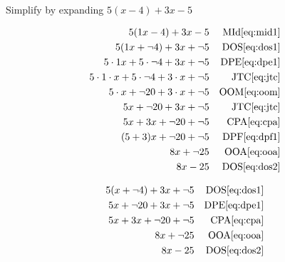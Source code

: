 \begin{example}[id:20141109-095151] \label{20141109-095151}  \hfill \\

Simplify by expanding $5(x-4)+3x-5$

\soln

\solnsteps
\begin{align*}
5(1x-4)+3x-5 && \text{MId} \eqref{eq:mid1} \\
5(1x + \neg 4)+3x + \neg 5 && \text{DOS} \eqref{eq:dos1} \\
5 \cdot 1x + 5 \cdot \neg 4 + 3x + \neg 5 && \text{DPE} \eqref{eq:dpe1} \\ 
5 \cdot 1 \cdot x + 5 \cdot \neg 4 + 3 \cdot x + \neg 5 && \text{JTC} \eqref{eq:jtc} \\
5 \cdot x + \neg 20 + 3 \cdot x + \neg 5 && \text{OOM} \eqref{eq:oom} \\
5x + \neg 20 + 3x + \neg 5 && \text{JTC} \eqref{eq:jtc} \\
5x + 3x + \neg 20 + \neg 5 && \text{CPA} \eqref{eq:cpa} \\
(5+3)x + \neg 20 + \neg 5 && \text{DPF} \eqref{eq:dpf1} \\
8x + \neg 25 && \text{OOA} \eqref{eq:ooa} \\
8x-25 && \text{DOS} \eqref{eq:dos2} 
\end{align*}

\soln

\lesssteps
\begin{align*}
5(x+ \neg 4)+3x + \neg 5 && \text{DOS} \eqref{eq:dos1} \\
5x + \neg 20 + 3x + \neg 5 && \text{DPE} \eqref{eq:dpe1} \\
5x + 3x + \neg 20 + \neg 5 && \text{CPA} \eqref{eq:cpa} \\
8x + \neg 25 && \text{OOA} \eqref{eq:ooa} \\
8x-25 && \text{DOS} \eqref{eq:dos2} 
\end{align*}

\end{example}

